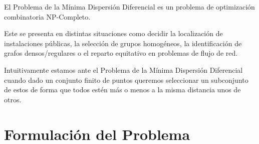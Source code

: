 
El Problema de la Mínima Dispersión Diferencial es un problema de optimización combinatoria NP-Completo.\cite{Seminario2MH}

Este se presenta en distintas situaciones como decidir la localización de instalaciones públicas,
la selección de grupos homogéneos, la identificación de grafos densos/regulares o el reparto equitativo en problemas de
flujo de red.\cite{DUARTE201546}

Intuitivamente estamos ante el Problema de la Mínima Dispersión Diferencial cuando dado un conjunto finito de puntos queremos
seleccionar un subconjunto de estos de forma que todos estén más o menos a la misma distancia unos de otros.

\section{Formulación del Problema}

